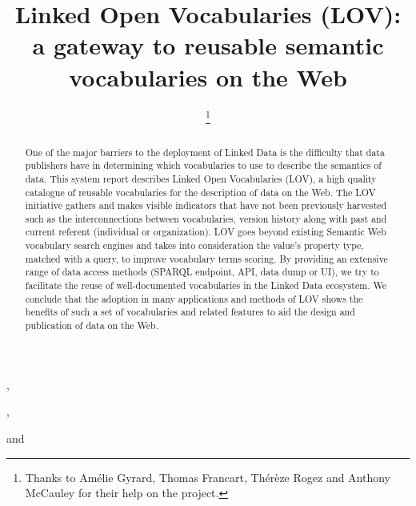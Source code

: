 \documentclass{iosart2c}
\begin{document}
\begin{frontmatter}                        %

%
\title{Linked Open Vocabularies (LOV): a gateway to reusable semantic vocabularies on the Web}




\author[A]{ \thanks{Thanks to Am\'elie Gyrard, Thomas Francart, Th\'er\`{e}ze Rogez and Anthony McCauley for their help on the project.}},
\author[B]{ },
\author[C]{ }
and
\author[D]{ }
\address[A]{Fujitsu (Ireland) Limited, Swords, Co. Dublin, Ireland\\
E-mail: pierre-yves.vandenbussche@ie.fujitsu.com}
\address[B]{Mondeca, 35 boulevard de Strasbourg, 75010 Paris, France\\
E-mail: ghislain.atemezing@mondeca.com}
\address[C]{Ontology Engineering Group (OEG), 
Universidad Polit\'ecnica de Madrid, Madrid, Spain\\
E-mail: mpoveda@fi.upm.es}
\address[D]{Mondeca, 35 boulevard de Strasbourg, 75010 Paris, France
\\
E-mail: bernard.vatant@mondeca.com}


\begin{abstract}
One of the major barriers to the deployment of Linked Data is the difficulty that data publishers have in determining which vocabularies to use to describe the semantics of data. This system report describes Linked Open Vocabularies (LOV), a high quality catalogue of reusable vocabularies for the description of data on the Web. The LOV initiative gathers and makes visible indicators that have not been previously harvested such as the interconnections between vocabularies, version history along with past and current referent (individual or organization). LOV goes beyond existing Semantic Web vocabulary search engines and takes into consideration the value's property type, matched with a query, to improve vocabulary terms scoring. By providing an extensive range of data access methods (SPARQL endpoint, API, data dump or UI), we try to facilitate the reuse of well-documented vocabularies in the Linked Data ecosystem. We conclude that the adoption in many applications and methods of LOV shows the benefits of such a set of vocabularies and related features to aid the design and publication of data on the Web.
\end{abstract}


\end{frontmatter}
\end{document}

